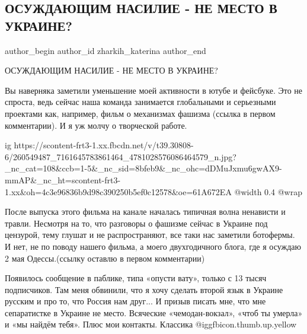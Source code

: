  
 
 
 
 
 
\subsection{ОСУЖДАЮЩИМ НАСИЛИЕ - НЕ МЕСТО В УКРАИНЕ?}
\label{sec:25_11_2021.fb.zharkih_katerina.1.nasilie_v_ukraine}
 
\ifcmt
 author_begin
   author_id zharkih_katerina
 author_end
\fi

ОСУЖДАЮЩИМ НАСИЛИЕ - НЕ МЕСТО В УКРАИНЕ? 

Вы наверняка заметили уменьшение моей активности в ютубе и фейсбуке. Это не
спроста, ведь сейчас наша команда занимается глобальными и серьезными проектами
как, например, фильм о механизмах фашизма (ссылка в первом комментарии). И я уж
молчу о творческой работе. 

\ifcmt
  ig https://scontent-frt3-1.xx.fbcdn.net/v/t39.30808-6/260549487_7161645783861464_4781028576086464579_n.jpg?_nc_cat=108&ccb=1-5&_nc_sid=8bfeb9&_nc_ohc=dDMuJxmu6gwAX9-mmAP&_nc_ht=scontent-frt3-1.xx&oh=4c3e96836b9d98c390250b5ef0c12578&oe=61A672EA
  @width 0.4
  @wrap 
\fi

После выпуска этого фильма на канале началась типичная волна ненависти и
травли. Несмотря на то, что разговоры о фашизме сейчас в Украине под цензурой,
тему глушат и не распространяют, все таки нас заметили ботофермы. И нет, не по
поводу нашего фильма, а моего двухгодичного блога, где я осуждаю 2 мая
Одессы.(ссылку оставлю в первом комментарии) 

Появилось сообщение в паблике, типа «опусти вату», только с 13 тысяч
подписчиков. Там меня обвинили, что я хочу сделать второй язык в Украине
русским и про то, что Россия нам друг... И призыв писать мне, что мне
сепаратистке в Украине не место. Всяческие «чемодан-вокзал», «чтоб ты умерла» и
«мы найдём тебя». Плюс мои контакты. Классика  @igg{fbicon.thumb.up.yellow}  

